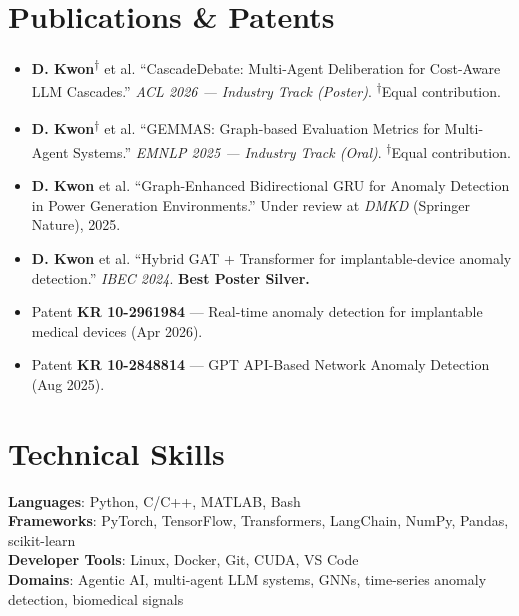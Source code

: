 \documentclass[letterpaper,11pt]{article}
\newcommand{\resumeSubHeadingListStart}{\begin{itemize}[leftmargin=0.15in, label={}]}
\newcommand{\resumeSubHeadingListEnd}{\end{itemize}}
\begin{document}
\section{Publications \& Patents}
  \resumeSubHeadingListStart
    \item\small{
      \textbf{D. Kwon}\textsuperscript{$\dagger$} et al. ``CascadeDebate: Multi-Agent Deliberation for Cost-Aware LLM Cascades.'' \textit{ACL 2026 --- Industry Track (Poster)}. \textsuperscript{$\dagger$}Equal contribution.
    }
    \item\small{
      \textbf{D. Kwon}\textsuperscript{$\dagger$} et al. ``GEMMAS: Graph-based Evaluation Metrics for Multi-Agent Systems.'' \textit{EMNLP 2025 --- Industry Track (Oral)}. \textsuperscript{$\dagger$}Equal contribution.
    }
    \item\small{
      \textbf{D. Kwon} et al. ``Graph-Enhanced Bidirectional GRU for Anomaly Detection in Power Generation Environments.'' Under review at \textit{DMKD} (Springer Nature), 2025.
    }
    \item\small{
      \textbf{D. Kwon} et al. ``Hybrid GAT + Transformer for implantable-device anomaly detection.'' \textit{IBEC 2024}. \textbf{Best Poster Silver.}
    }
    \item\small{
      Patent \textbf{KR 10-2961984} --- Real-time anomaly detection for implantable medical devices (Apr 2026).
    }
    \item\small{
      Patent \textbf{KR 10-2848814} --- GPT API-Based Network Anomaly Detection (Aug 2025).
    }
  \resumeSubHeadingListEnd

\section{Technical Skills}
 \begin{itemize}[leftmargin=0.15in, label={}]
    \small{\item{
     \textbf{Languages}{: Python, C/C++, MATLAB, Bash} \\
     \textbf{Frameworks}{: PyTorch, TensorFlow, Transformers, LangChain, NumPy, Pandas, scikit-learn} \\
     \textbf{Developer Tools}{: Linux, Docker, Git, CUDA, VS Code} \\
     \textbf{Domains}{: Agentic AI, multi-agent LLM systems, GNNs, time-series anomaly detection, biomedical signals}
    }}
 \end{itemize}

\end{document}
